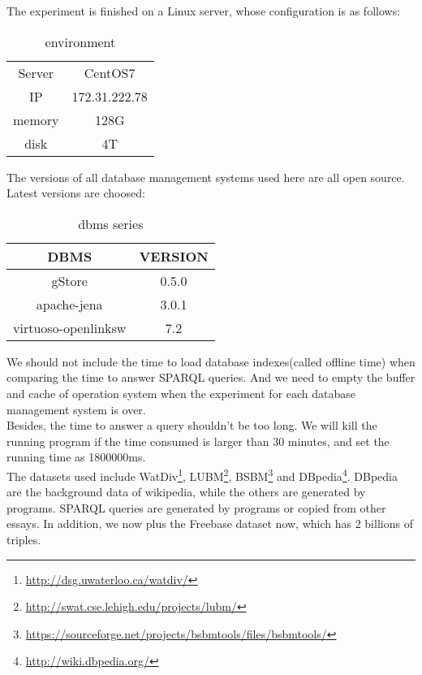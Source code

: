 \documentclass[titlepage, a4paper, 12pt] {article}
\begin{document}
The experiment is finished on a Linux server, whose configuration is as follows: \\
\begin{table}[!hbp]
	\centering
	\begin{tabular}{|c|c|}
		\toprule
		Server & CentOS7 \\
		IP & 172.31.222.78 \\ 
		\midrule
		memory & 128G \\
		disk & 4T \\
		\bottomrule
	\end{tabular}
	\caption{environment}
\end{table}

The versions of all database management systems used here are all open source. Latest versions are choosed: \\
\begin{table}[!hbp]
	\centering
	\begin{tabular}{|c|c|}
		\toprule
		DBMS & VERSION \\
		\midrule
		gStore & 0.5.0 \\
		apache-jena & 3.0.1 \\
		virtuoso-openlinksw & 7.2 \\
		\bottomrule
	\end{tabular}
	\caption{dbms series}
\end{table}

We should not include the time to load database indexes(called offline time) when comparing the time to answer SPARQL queries. And we need to empty the buffer and cache of operation system when the experiment for each database management system is over. \\

Besides, the time to answer a query shouldn't be too long. We will kill the running program if the time consumed is larger than 30 minutes, and set the running time as 1800000ms. \\

The datasets used include WatDiv\footnote{\href{http://dsg.uwaterloo.ca/watdiv/}{http://dsg.uwaterloo.ca/watdiv/}}, 
LUBM\footnote{\href{http://swat.cse.lehigh.edu/projects/lubm/}{http://swat.cse.lehigh.edu/projects/lubm/}}, BSBM\footnote{\href{https://sourceforge.net/projects/bsbmtools/files/bsbmtools/}{https://sourceforge.net/projects/bsbmtools/files/bsbmtools/}} and DBpedia\footnote{\href{http://wiki.dbpedia.org/}{http://wiki.dbpedia.org/}}. DBpedia are the background data of wikipedia, 
while the others are generated by programs. SPARQL queries are generated by programs or copied from other essays. 
In addition, we now plus the Freebase dataset now, which has 2 billions of triples. \\
\end{document}
